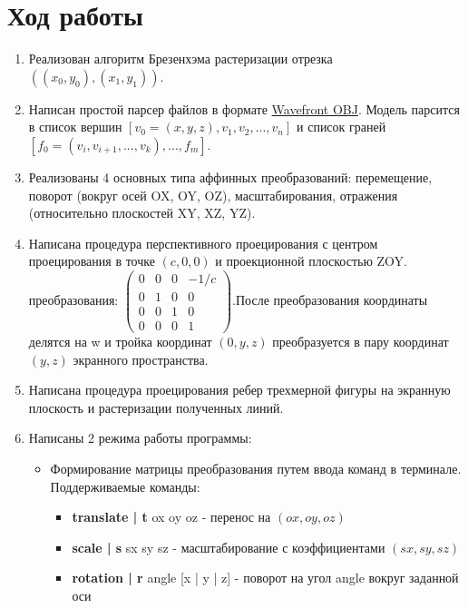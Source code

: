 \documentclass[a4paper,12pt]{article}
\begin{document}
\section{\normalsize{Ход работы}}
\begin{flushleft}
  \begin{enumerate}
    \item Реализован алгоритм Брезенхэма растеризации отрезка \(((x_0, y_0),(x_1,y_1))\).
    \item Написан простой парсер файлов в формате \href{https://ru.wikipedia.org/wiki/Obj}{Wavefront OBJ}. Модель парсится в список вершин \([v_0 = (x, y, z), v_1, v_2, ..., v_n]\) и список граней \([f_0 = (v_i, v_{i+1}, ..., v_k), ..., f_m]\).
    \item Реализованы 4 основных типа аффинных преобразований: перемещение, поворот (вокруг осей OX, OY, OZ), масштабирования, отражения (относительно плоскостей XY, XZ, YZ).
    \item Написана процедура перспективного проецирования с центром проецирования в точке \((c, 0, 0)\) и проекционной плоскостью ZOY.  преобразования: \(\begin{pmatrix}0 & 0 & 0 & - 1/c \\ 0 & 1 & 0 & 0 \\ 0 & 0 & 1 & 0 \\ 0 & 0 & 0 & 1\end{pmatrix}\).\linebreak После преобразования координаты делятся на w и тройка координат \((0, y, z)\) преобразуется в пару координат \((y, z)\) экранного пространства. 
    \item Написана процедура проецирования ребер трехмерной фигуры на экранную плоскость и растеризации полученных линий.
    \item Написаны 2 режима работы программы:
      \linebreak
      \begin{itemize}
        \item Формирование матрицы преобразования путем ввода команд в терминале. Поддерживаемые команды:
          \linebreak
          \begin{itemize}
            \item \textbf{translate | t} ox oy oz - перенос на \((ox, oy, oz)\)
            \item \textbf{scale | s} sx sy sz - масштабирование с коэффициентами \((sx, sy, sz)\)
            \item \textbf{rotation | r} angle [x | y | z] - поворот на угол angle вокруг заданной оси

\end{itemize}
\end{itemize}
\end{enumerate}
\end{flushleft}
\end{document}
